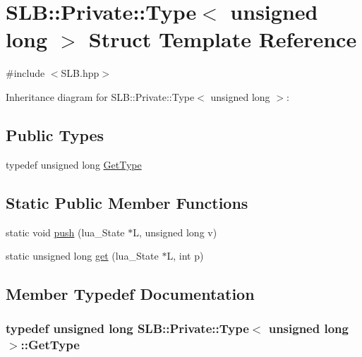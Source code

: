 \hypertarget{structSLB_1_1Private_1_1Type_3_01unsigned_01long_01_4}{}\section{S\+LB\+:\+:Private\+:\+:Type$<$ unsigned long $>$ Struct Template Reference}
\label{structSLB_1_1Private_1_1Type_3_01unsigned_01long_01_4}


{\ttfamily \#include $<$S\+L\+B.\+hpp$>$}



Inheritance diagram for S\+LB\+:\+:Private\+:\+:Type$<$ unsigned long $>$\+:
\subsection*{Public Types}
\begin{DoxyCompactItemize}
\item 
typedef unsigned long \hyperlink{structSLB_1_1Private_1_1Type_3_01unsigned_01long_01_4_a2a1a097d18a88c5147081189bc7e3c55}{Get\+Type}
\end{DoxyCompactItemize}
\subsection*{Static Public Member Functions}
\begin{DoxyCompactItemize}
\item 
static void \hyperlink{structSLB_1_1Private_1_1Type_3_01unsigned_01long_01_4_a4bee1fd3338605ca9235bf3ab7e6bb83}{push} (lua\+\_\+\+State $\ast$L, unsigned long v)
\item 
static unsigned long \hyperlink{structSLB_1_1Private_1_1Type_3_01unsigned_01long_01_4_ab9f3b6db21d1ab76b0e91991fde4c164}{get} (lua\+\_\+\+State $\ast$L, int p)
\end{DoxyCompactItemize}


\subsection{Member Typedef Documentation}
\subsubsection[{\texorpdfstring{Get\+Type}{GetType}}]{\setlength{\rightskip}{0pt plus 5cm}typedef unsigned long {\bf S\+L\+B\+::\+Private\+::\+Type}$<$ unsigned long $>$\+::{\bf Get\+Type}}\hypertarget{structSLB_1_1Private_1_1Type_3_01unsigned_01long_01_4_a2a1a097d18a88c5147081189bc7e3c55}{}\label{structSLB_1_1Private_1_1Type_3_01unsigned_01long_01_4_a2a1a097d18a88c5147081189bc7e3c55}


